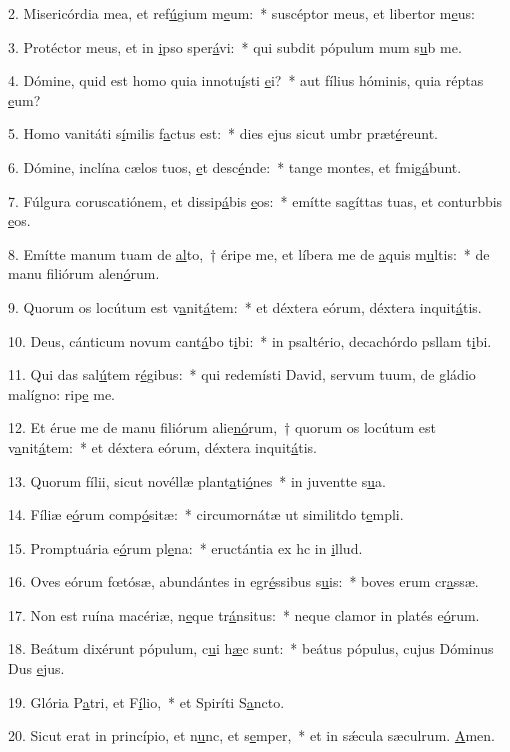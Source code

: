 2. Misericórdia mea, et ref\uline{ú}gium m\uline{e}um:~* suscéptor meus, et libertor m\uline{e}us:\par 
3. Protéctor meus, et in \uline{i}pso sper\uline{á}vi:~* qui subdit pópulum mum s\uline{u}b me.\par 
4. Dómine, quid est homo quia innotu\uline{í}sti \uline{e}i?~* aut fílius hóminis, quia réptas \uline{e}um?\par 
5. Homo vanitáti s\uline{í}milis f\uline{a}ctus est:~* dies ejus sicut umbr præt\uline{é}reunt.\par 
6. Dómine, inclína cælos tuos, \uline{e}t desc\uline{é}nde:~* tange montes, et fmig\uline{á}bunt.\par 
7. Fúlgura coruscatiónem, et dissip\uline{á}bis \uline{e}os:~* emítte sagíttas tuas, et conturbbis \uline{e}os.\par 
8. Emítte manum tuam de \uline{al}to,~† éripe me, et líbera me de \uline{a}quis m\uline{u}ltis:~* de manu filiórum alen\uline{ó}rum.\par 
9. Quorum os locútum est v\uline{a}nit\uline{á}tem:~* et déxtera eórum, déxtera inquit\uline{á}tis.\par 
10. Deus, cánticum novum cant\uline{á}bo t\uline{i}bi:~* in psaltério, decachórdo psllam t\uline{i}bi.\par 
11. Qui das sal\uline{ú}tem r\uline{é}gibus:~* qui redemísti David, servum tuum, de gládio malígno: rip\uline{e} me.\par 
12. Et érue me de manu filiórum alie\uline{nó}rum,~† quorum os locútum est v\uline{a}nit\uline{á}tem:~* et déxtera eórum, déxtera inquit\uline{á}tis.\par 
13. Quorum fílii, sicut novéllæ plant\uline{a}ti\uline{ó}nes~* in juventte s\uline{u}a.\par 
14. Fíliæ e\uline{ó}rum comp\uline{ó}sitæ:~* circumornátæ ut similitdo t\uline{e}mpli.\par 
15. Promptuária e\uline{ó}rum pl\uline{e}na:~* eructántia ex hc in \uline{i}llud.\par 
16. Oves eórum fœtósæ, abundántes in egr\uline{é}ssibus s\uline{u}is:~* boves erum cr\uline{a}ssæ.\par 
17. Non est ruína macériæ, n\uline{e}que tr\uline{á}nsitus:~* neque clamor in platés e\uline{ó}rum.\par 
18. Beátum dixérunt pópulum, c\uline{u}i h\uline{æ}c sunt:~* beátus pópulus, cujus Dóminus Dus \uline{e}jus.\par 
19. Glória P\uline{a}tri, et F\uline{í}lio,~* et Spiríti S\uline{a}ncto.\par 
20. Sicut erat in princípio, et n\uline{u}nc, et s\uline{e}mper,~* et in sǽcula sæculrum. \uline{A}men.\par 
